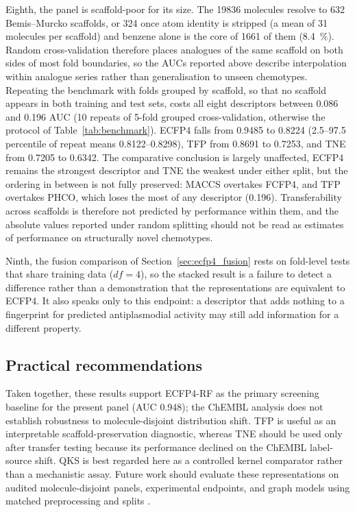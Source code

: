 \documentclass[pdflatex,sn-mathphys-num]{sn-jnl}%
\begin{document}
Eighth, the panel is scaffold-poor for its size. The \num{19836} molecules resolve to \num{632} Bemis--Murcko scaffolds, or \num{324} once atom identity is stripped (a mean of \num{31} molecules per scaffold) and benzene alone is the core of \num{1661} of them (\qty{8.4}{\percent}). Random cross-validation therefore places analogues of the same scaffold on both sides of most fold boundaries, so the AUCs reported above describe interpolation within analogue series rather than generalisation to unseen chemotypes. Repeating the benchmark with folds grouped by scaffold, so that no scaffold appears in both training and test sets, costs all eight descriptors between \num{0.086} and \num{0.196} AUC (10 repeats of 5-fold grouped cross-validation, otherwise the protocol of Table~\ref{tab:benchmark}). ECFP4 falls from \num{0.9485} to \num{0.8224} (2.5--97.5 percentile of repeat means \num{0.8122}--\num{0.8298}), TFP from \num{0.8691} to \num{0.7253}, and TNE from \num{0.7205} to \num{0.6342}. The comparative conclusion is largely unaffected, ECFP4 remains the strongest descriptor and TNE the weakest under either split, but the ordering in between is not fully preserved: MACCS overtakes FCFP4, and TFP overtakes PHCO, which loses the most of any descriptor (\num{0.196}). Transferability across scaffolds is therefore not predicted by performance within them, and the absolute values reported under random splitting should not be read as estimates of performance on structurally novel chemotypes.

Ninth, the fusion comparison of Section~\ref{sec:ecfp4_fusion} rests on fold-level tests that share training data ($df = 4$), so the stacked result is a failure to detect a difference rather than a demonstration that the representations are equivalent to ECFP4. It also speaks only to this endpoint: a descriptor that adds nothing to a fingerprint for predicted antiplasmodial activity may still add information for a different property.

\subsection{Practical recommendations}

Taken together, these results support ECFP4-RF as the primary screening baseline for the present panel (AUC \num{0.948}); the ChEMBL analysis does not establish robustness to molecule-disjoint distribution shift. TFP is useful as an interpretable scaffold-preservation diagnostic, whereas TNE should be used only after transfer testing because its performance declined on the ChEMBL label-source shift. QKS is best regarded here as a controlled kernel comparator rather than a mechanistic assay. Future work should evaluate these representations on audited molecule-disjoint panels, experimental endpoints, and graph models using matched preprocessing and splits \cite{topologynet_2018}.
\end{document}
